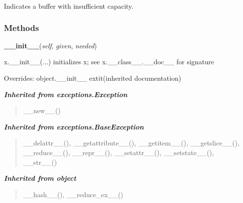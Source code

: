 Indicates a buffer with insufficient capacity.



  \subsubsection{Methods}

    \vspace{0.5ex}

\hspace{.8\funcindent}\begin{boxedminipage}{\funcwidth}

    \raggedright \textbf{\_\_init\_\_}(\textit{self}, \textit{given}, \textit{needed})

\setlength{\parskip}{2ex}
    x.\_\_init\_\_(...) initializes x; see x.\_\_class\_\_.\_\_doc\_\_ for 
    signature

\setlength{\parskip}{1ex}
      Overrides: object.\_\_init\_\_ 	extit{(inherited documentation)}

    \end{boxedminipage}


\large{\textbf{\textit{Inherited from exceptions.Exception}}}

\begin{quote}
\_\_new\_\_()
\end{quote}

\large{\textbf{\textit{Inherited from exceptions.BaseException}}}

\begin{quote}
\_\_delattr\_\_(), \_\_getattribute\_\_(), \_\_getitem\_\_(), \_\_getslice\_\_(), \_\_reduce\_\_(), \_\_repr\_\_(), \_\_setattr\_\_(), \_\_setstate\_\_(), \_\_str\_\_()
\end{quote}

\large{\textbf{\textit{Inherited from object}}}

\begin{quote}
\_\_hash\_\_(), \_\_reduce\_ex\_\_()
\end{quote}


